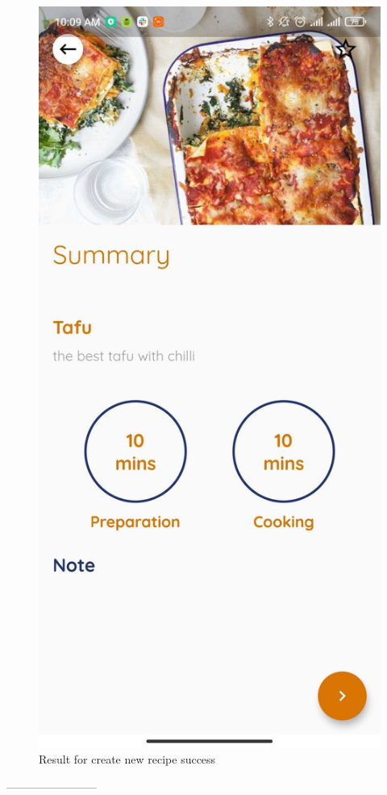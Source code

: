 \documentclass{article}
\begin{document}
        \begin{figure}[h!]
        \centering
        \includegraphics[scale=0.1]{Images/Homepage_data.jpg}
        \caption{Result for create new recipe success}
        \label{fig:cookingbook}
        \end{figure}
        ------------------------\\ \\ \\
\end{document}
